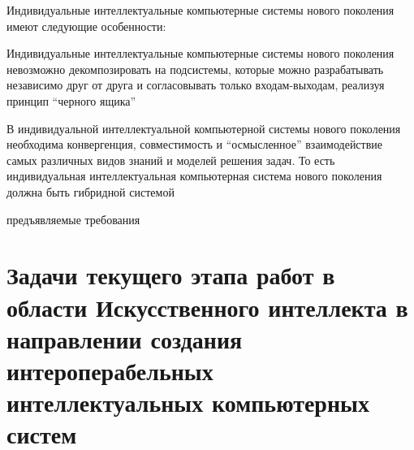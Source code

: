 Индивидуальные интеллектуальные компьютерные системы нового поколения имеют следующие особенности:

\begin{textitemize}
	\item Индивидуальные интеллектуальные компьютерные системы нового поколения невозможно декомпозировать на подсистемы, которые можно разрабатывать независимо друг от друга и согласовывать только входам-выходам, реализуя принцип ``черного ящика''
	\item В индивидуальной интеллектуальной компьютерной системы нового поколения необходима конвергенция, совместимость и ``осмысленное'' взаимодействие самых различных видов знаний и моделей решения задач. То есть индивидуальная интеллектуальная компьютерная система нового поколения должна быть гибридной системой
\end{textitemize}

\begin{SCn}
	\begin{scnrelfromlist}{предъявляемые требования}
	\end{scnrelfromlist}
\end{SCn}

\section*{Задачи текущего этапа работ в области Искусственного интеллекта в направлении создания интероперабельных интеллектуальных компьютерных систем}


